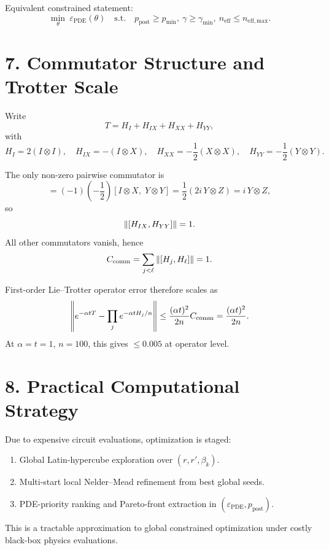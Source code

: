 \documentclass[11pt]{article}
\begin{document}
Equivalent constrained statement:
\begin{equation}
\min_{\theta}\ \varepsilon_{\mathrm{PDE}}(\theta)
\quad\text{s.t.}\quad
p_{\mathrm{post}}\ge p_{\min},\
\gamma\ge\gamma_{\min},\
n_{\mathrm{eff}}\le n_{\mathrm{eff,max}}.
\end{equation}

\section*{7. Commutator Structure and Trotter Scale}
Write
\begin{equation}
T = H_I + H_{IX} + H_{XX} + H_{YY},
\end{equation}
with
\begin{equation}
H_I=2(I\otimes I),\quad
H_{IX}=-(I\otimes X),\quad
H_{XX}=-\frac12(X\otimes X),\quad
H_{YY}=-\frac12(Y\otimes Y).
\end{equation}

The only non-zero pairwise commutator is
\begin{equation}
[H_{IX},H_{YY}]
=\left(-1\right)\left(-\frac12\right)[I\otimes X,\;Y\otimes Y]
=\frac12\left(2i\,Y\otimes Z\right)
= i\,Y\otimes Z,
\end{equation}
so
\begin{equation}
\norm{[H_{IX},H_{YY}]}=1.
\end{equation}
All other commutators vanish, hence
\begin{equation}
C_{\mathrm{comm}}=\sum_{j<\ell}\norm{[H_j,H_\ell]}=1.
\end{equation}

First-order Lie--Trotter operator error therefore scales as
\begin{equation}
\norm{e^{-\alpha t T}-\prod_j e^{-\alpha t H_j/n}}
\le
\frac{(\alpha t)^2}{2n}C_{\mathrm{comm}}
=\frac{(\alpha t)^2}{2n}.
\end{equation}
At $\alpha=t=1$, $n=100$, this gives $\le 0.005$ at operator level.

\section*{8. Practical Computational Strategy}
Due to expensive circuit evaluations, optimization is staged:
\begin{enumerate}
\item Global Latin-hypercube exploration over $(r,r',\beta_k)$.
\item Multi-start local Nelder--Mead refinement from best global seeds.
\item PDE-priority ranking and Pareto-front extraction in $(\varepsilon_{\mathrm{PDE}},p_{\mathrm{post}})$.
\end{enumerate}
This is a tractable approximation to global constrained optimization under costly black-box physics evaluations.
\end{document}
